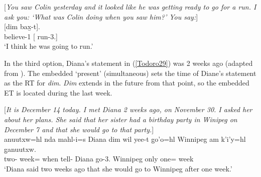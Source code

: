 \documentclass[output=paper]{langscibook}
\begin{document}
\begin{exe}
\ex \label{Todoro28}
\begin{xlist}

\ex \label{Todoro28a} [\emph{You saw Colin yesterday and it looked like he was getting ready 
     to go for a run. I ask you: ‘What was Colin doing when you saw  
     him?’ You say:}]\\
 	[{dim}	{bax̱-t}].  \\
    believe-1	[	run-3.{\seriesII}] \\
\glt ‘I think he was going to run.’ 

\ex \label{Todoro28b}

\end{xlist}
\end{exe}

In the third option, Diana’s statement in (\ref{Todoro29}) was 2 weeks ago (adapted from \citealt{johannsdottirmatthewson2007a}). The embedded ‘present’ (simultaneous) sets the time of Diane’s statement as the RT for \emph{dim}. \emph{Dim} extends in the future from that point, so the embedded ET is located during the last week.

\begin{exe}
\ex \label{Todoro29}
\begin{xlist}

\ex \label{Todoro29a} [\emph{It is December 14 today. I met Diana 2 weeks ago, on 
November 30. I asked her about her plans. She said that her sister had a birthday party in Winipeg on December 7 and that she would go to that party.}]\\
 {anuutxw=hl}	{nda}          {mahl-i=s} {Diana}    {dim}      {wil} {yee-t}	{g̱o’o=hl} {Winnipeg} {am} {k’i’y=hl}	{g̱anuutxw}. \\
    two- week={\cn} 	when 	     tell- Diana	       go-3.{\seriesII}          Winnipeg	only one=	week\\
\glt ‘Diana said two weeks ago that she would go to Winnipeg after 	 one week.’ 

\ex \label{Todoro29b}

\end{xlist}
\end{exe}
\end{document}
